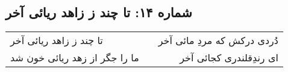 \begin{center}
\section*{شماره ۱۴: تا چند ز زاهد ریائی آخر}
\label{sec:014}
\begin{longtable}{l p{0.5cm} r}
تا چند ز زاهد ریائی آخر
&&
دُردی درکش که مردِ مائی آخر
\\
ما را جگر از زهد ریائی خون شد
&&
ای رندِ‌قلندری کجائی آخر
\\
\end{longtable}
\end{center}
